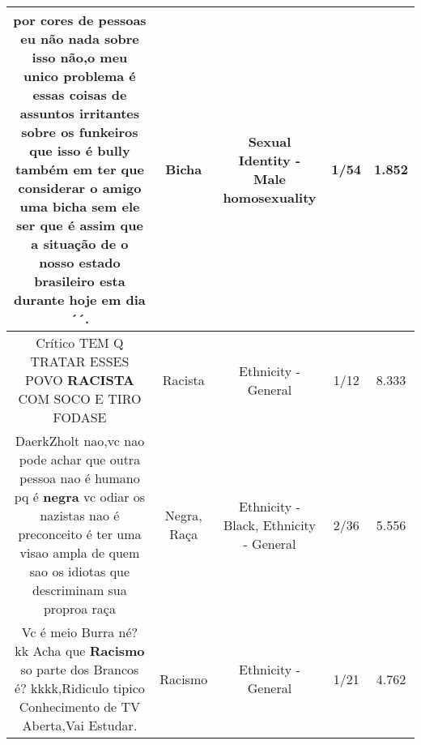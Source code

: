 \documentclass[11pt]{article}
\newlength\mylength
\begin{document}
\begin{center}
\begin{longtable}{|C{.65\mylength}|C{.30\mylength}|C{.12\mylength}|C{.12\mylength}|C{.12\mylength}|}
  \small por cores de pessoas eu não nada sobre isso não,o meu unico problema é essas coisas de assuntos irritantes sobre os funkeiros que isso é bully também em ter que considerar o amigo uma \textbf{bicha} sem ele ser que é assim que a situação de o nosso estado brasileiro esta durante hoje em dia´´.\normalsize   & Bicha & Sexual Identity - Male homosexuality & 1/54 & 1.852 \\  \hline
  \small Crítico TEM Q TRATAR ESSES POVO \textbf{RACISTA} COM SOCO E TIRO FODASE\normalsize   & Racista & Ethnicity - General & 1/12 & 8.333 \\  \hline
  \small DaerkZholt nao,vc nao pode achar que outra pessoa nao é humano pq é \textbf{negra} vc odiar os nazistas nao é preconceito é ter uma visao ampla de quem sao os idiotas que descriminam sua proproa raça\normalsize   & Negra, Raça & Ethnicity - Black, Ethnicity - General & 2/36 & 5.556 \\  \hline
  \small Vc é meio Burra né? kk Acha que \textbf{Racismo} so parte dos Brancos é? kkkk,Ridiculo tipico Conhecimento de TV Aberta,Vai Estudar.\normalsize   & Racismo & Ethnicity - General & 1/21 & 4.762 \\  \hline

\end{longtable}
\end{center}
\end{document}
